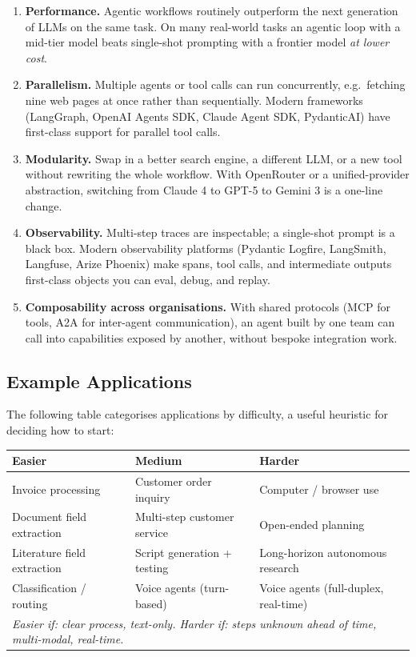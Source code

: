 \documentclass[a4paper,11pt]{article}
\begin{document}
\begin{enumerate}[noitemsep, leftmargin=1.4em]
  \item \textbf{Performance.} Agentic workflows routinely outperform
        the next generation of LLMs on the same task. On many real-world
        tasks an agentic loop with a mid-tier model beats single-shot
        prompting with a frontier model \emph{at lower cost}.
  \item \textbf{Parallelism.} Multiple agents or tool calls can run
        concurrently, e.g.\ fetching nine web pages at once rather
        than sequentially. Modern frameworks (LangGraph, OpenAI Agents
        SDK, Claude Agent SDK, PydanticAI) have first-class support
        for parallel tool calls.
  \item \textbf{Modularity.} Swap in a better search engine, a
        different LLM, or a new tool without rewriting the whole
        workflow. With OpenRouter or a unified-provider abstraction,
        switching from Claude 4 to GPT-5 to Gemini 3 is a one-line
        change.
  \item \textbf{Observability.} Multi-step traces are inspectable; a
        single-shot prompt is a black box. Modern observability
        platforms (Pydantic Logfire, LangSmith, Langfuse, Arize
        Phoenix) make spans, tool calls, and intermediate outputs
        first-class objects you can eval, debug, and replay.
  \item \textbf{Composability across organisations.} With shared
        protocols (MCP for tools, A2A for inter-agent communication),
        an agent built by one team can call into capabilities exposed
        by another, without bespoke integration work.
\end{enumerate}

\subsection{Example Applications}

The following table categorises applications by difficulty, a useful
heuristic for deciding how to start:

\begin{center}\small
\begin{tabular}{p{4cm} p{4cm} p{5cm}}
  \toprule
  \textbf{Easier} & \textbf{Medium} & \textbf{Harder} \\
  \midrule
  Invoice processing       & Customer order inquiry      & Computer / browser use \\
  Document field extraction& Multi-step customer service & Open-ended planning \\
  Literature field extraction& Script generation + testing & Long-horizon autonomous research \\
  Classification / routing  & Voice agents (turn-based)  & Voice agents (full-duplex, real-time) \\
  \midrule
  \multicolumn{3}{l}{\small\itshape Easier if: clear process, text-only. Harder if: steps unknown ahead of time, multi-modal, real-time.} \\
  \bottomrule
\end{tabular}
\end{center}
\end{document}
